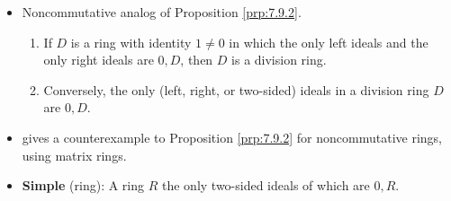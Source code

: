 \documentclass[../notes.tex]{subfiles}
\begin{document}
\begin{itemize}
\begin{proposition}
\begin{enumerate}[ref={\theproposition(\arabic*)}]
            \item \label{prp:7.9.1}$I=R$ iff $I$ contains a unit.
            \begin{proof}
                Given.
            \end{proof}
            \item \label{prp:7.9.2}If $R$ is commutative, then $R$ is a field iff its only ideals are 0 and $R$.
            \begin{proof}
                Given.
            \end{proof}
        \end{enumerate}
    \end{proposition}
    \begin{corollary}\label{cly:7.10}
        If $R$ is a field, then any nonzero ring homomorphism from $R$ into another ring is an injection.
        \begin{proof}
            Let $S$ be a ring for which there exists a nonzero ring homomorphism $\varphi:R\to S$\footnote{Not any ring can be $S$; for instance, there exists no nonzero \emph{ring homomorphism} $\varphi:\R\to\Z$. So don't worry; it's not like this corollary implies that there is an injection from $\R$ to $\Z$.}. To prove that $\varphi$ is an injection, it will suffice to show that $\ker\varphi=\{0\}$. Since $\varphi$ is a ring homomorphism, $\ker\varphi$ is an ideal. Since $\varphi$ is nonzero, $\ker\varphi\subsetneq R$. Thus, since the only ideals of $R$ a field are $0,R$ by Proposition \ref{prp:7.9.2}, $\ker\varphi=\{0\}$, as desired.
        \end{proof}
    \end{corollary}
    \item Noncommutative analog of Proposition \ref{prp:7.9.2}.
    \begin{enumerate}
        \item If $D$ is a ring with identity $1\neq 0$ in which the only left ideals and the only right ideals are $0,D$, then $D$ is a division ring.
        \item Conversely, the only (left, right, or two-sided) ideals in a division ring $D$ are $0,D$.
    \end{enumerate}
    \item \textcite{bib:DummitFoote} gives a counterexample to Proposition \ref{prp:7.9.2} for noncommutative rings, using matrix rings.
    \item \textbf{Simple} (ring): A ring $R$ the only two-sided ideals of which are $0,R$.
    \begin{itemize}

\end{itemize}
\end{itemize}
\end{document}
